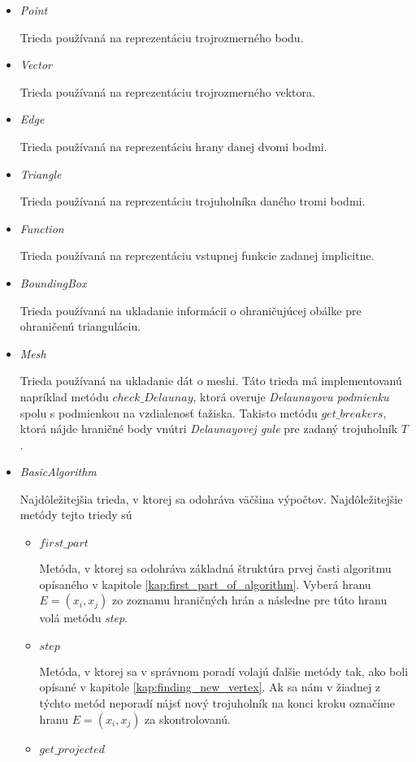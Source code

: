 \begin{itemize}
    \item{
        \textit{Point}

        Trieda používaná na reprezentáciu trojrozmerného bodu.
    }
    \item{
        \textit{Vector}
        
        Trieda používaná na reprezentáciu trojrozmerného vektora. 
    }
    \item{
        \textit{Edge}

        Trieda používaná na reprezentáciu hrany danej dvomi bodmi.
    }
    \item{
        \textit{Triangle}

        Trieda používaná na reprezentáciu trojuholníka daného tromi bodmi.
    }
    \item{
        \textit{Function}

        Trieda používaná na reprezentáciu vstupnej funkcie zadanej implicitne. 
    }
    \item{
        \textit{BoundingBox}

        Trieda používaná na ukladanie informácii o ohraničujúcej obálke pre ohraničenú trianguláciu.
    }
    \item{
        \textit{Mesh}

        Trieda používaná na ukladanie dát o meshi. Táto trieda má implementovanú napríklad metódu
        $check\_Delaunay$, ktorá overuje \textit{Delaunayovu podmienku} spolu s podmienkou
        na vzdialenosť ťažiska. Takisto metódu $get\_breakers$, ktorá nájde hraničné body 
        vnútri \textit{Delaunayovej gule} pre zadaný trojuholník $T$.
    }
    \item{
        \textit{BasicAlgorithm}

        Najdôležitejšia trieda, v ktorej sa odohráva väčšina výpočtov. Najdôležitejšie metódy 
        tejto triedy sú
        \begin{itemize}
            \item{
                $first\_part$
                
                Metóda, v ktorej sa odohráva základná štruktúra prvej časti algoritmu opísaného v kapitole 
                \ref{kap:first_part_of_algorithm}. Vyberá hranu $E=(x_i, x_j)$ zo zoznamu hraničných 
                hrán a následne pre túto hranu volá metódu \textit{step}.
            }
            \item{
                $step$

                Metóda, v ktorej sa v správnom poradí volajú ďalšie metódy tak, ako boli opísané v 
                kapitole \ref{kap:finding_new_vertex}.
                Ak sa nám v žiadnej z týchto metód neporadí nájsť nový trojuholník na konci kroku 
                označíme hranu $E = (x_i, x_j)$ za skontrolovanú.
            }
            \item{
                $get\_projected$

}
\end{itemize}}
\end{itemize}

